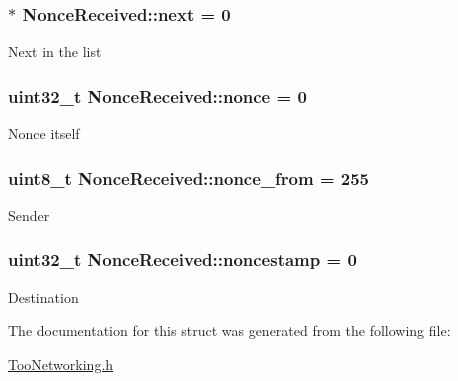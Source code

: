 \subsubsection[{\texorpdfstring{next}{next}}]{$\ast$ Nonce\+Received\+::next = 0}\hypertarget{structNonceReceived_ad976d0df8941f1f626de24afd2febca7}{}\label{structNonceReceived_ad976d0df8941f1f626de24afd2febca7}
Next in the list 
\subsubsection[{\texorpdfstring{nonce}{nonce}}]{\setlength{\rightskip}{0pt plus 5cm}uint32\+\_\+t Nonce\+Received\+::nonce = 0}\hypertarget{structNonceReceived_a8da2f90de05746f252706f24ec5bc539}{}\label{structNonceReceived_a8da2f90de05746f252706f24ec5bc539}
Nonce itself 
\subsubsection[{\texorpdfstring{nonce\+\_\+from}{nonce_from}}]{\setlength{\rightskip}{0pt plus 5cm}uint8\+\_\+t Nonce\+Received\+::nonce\+\_\+from = 255}\hypertarget{structNonceReceived_aa6f2777bb591400ce057bd1fa9b23fca}{}\label{structNonceReceived_aa6f2777bb591400ce057bd1fa9b23fca}
Sender 
\subsubsection[{\texorpdfstring{noncestamp}{noncestamp}}]{\setlength{\rightskip}{0pt plus 5cm}uint32\+\_\+t Nonce\+Received\+::noncestamp = 0}\hypertarget{structNonceReceived_ae159a71415a2908807ef1ed39f0b9dfa}{}\label{structNonceReceived_ae159a71415a2908807ef1ed39f0b9dfa}
Destination 

The documentation for this struct was generated from the following file\+:\begin{DoxyCompactItemize}
\item 
\hyperlink{TooNetworking_8h}{Too\+Networking.\+h}\end{DoxyCompactItemize}
